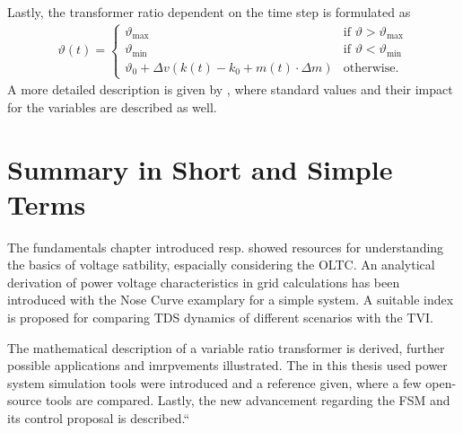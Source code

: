 Lastly, the transformer ratio dependent on the time step is formulated as 
\begin{align}
    \vartheta(t) = \begin{cases}
        \vartheta_\mathrm{max} & \text{if }\vartheta > \vartheta_\mathrm{max} \\
        \vartheta_\mathrm{min} & \text{if }\vartheta < \vartheta_\mathrm{min} \\
        \vartheta_0 + \Delta v (k(t)-k_0+m(t) \cdot \Delta m) & \text{otherwise.}
    \end{cases}\label{eq:fsm-control-transformer-ratio}
\end{align}
A more detailed description is given by \textcite{burlakin_2024}, where standard values and their impact for the variables are described as well.

\section{Summary in Short and Simple Terms}

The fundamentals chapter introduced resp. showed resources for understanding the basics of voltage satbility, espacially considering the \acs{OLTC}.
An analytical derivation of power voltage characteristics in grid calculations has been introduced with the Nose Curve examplary for a simple system.
A suitable index is proposed for comparing \ac{TDS} dynamics of different scenarios with the \acf{TVI}.

The mathematical description of a variable ratio transformer is derived, further possible applications and imrpvements illustrated.
The in this thesis used power system simulation tools were introduced and a reference given, where a few open-source tools are compared.
Lastly, the new advancement regarding the \acs{FSM} and its control proposal is described.``


